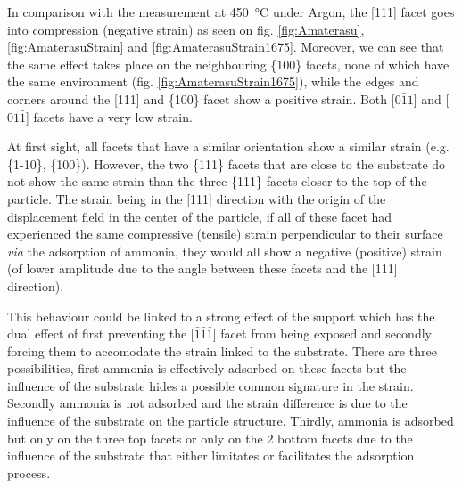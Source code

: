 
In comparison with the measurement at \qty{450}{\degreeCelsius} under Argon, the [111] facet goes into compression (negative strain) as seen on fig. \ref{fig:Amaterasu}, \ref{fig:AmaterasuStrain} and \ref{fig:AmaterasuStrain1675}.
Moreover, we can see that the same effect takes place on the neighbouring \{100\} facets, none of which have the same environment (fig. \ref{fig:AmaterasuStrain1675}), while the edges and corners around the [111] and \{100\} facet show a positive strain.
Both [$0\bar{1}1$] and [$01\bar{1}$] facets have a very low strain.

At first sight, all facets that have a similar orientation show a similar strain (e.g. \{1-10\}, \{100\}).
However, the two \{111\} facets that are close to the substrate do not show the same strain than the three \{111\} facets closer to the top of the particle.
The strain being in the [111] direction with the origin of the displacement field in the center of the particle, if all of these facet had experienced the same compressive (tensile) strain perpendicular to their surface \textit{via} the adsorption of ammonia, they would all show a negative (positive) strain (of lower amplitude due to the angle between these facets and the [111] direction).

This behaviour could be linked to a strong effect of the support which has the dual effect of first preventing the [$\bar{1}\bar{1}\bar{1}$] facet from being exposed and secondly forcing them to accomodate the strain linked to the substrate.
There are three possibilities, first ammonia is effectively adsorbed on these facets but the influence of the substrate hides a possible common signature in the strain.
Secondly ammonia is not adsorbed and the strain difference is due to the influence of the substrate on the particle structure.
Thirdly, ammonia is adsorbed but only on the three top facets or only on the 2 bottom facets due to the influence of the substrate that either limitates or facilitates the adsorption process.



